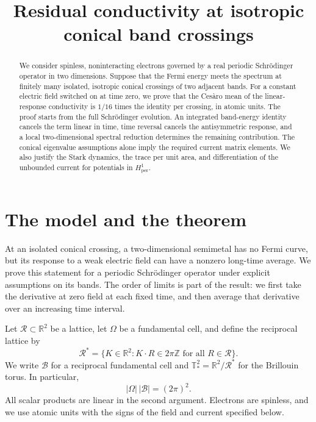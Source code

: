 \documentclass[11pt,a4paper]{article}
\title{Residual conductivity at isotropic conical band crossings}
\author{}
\date{}
\newcommand{\R}{\mathbb R}
\newcommand{\Z}{\mathbb Z}
\newcommand{\B}{\mathcal B}
\newcommand{\lat}{\mathcal R}
\newcommand{\T}{\mathbb T_{\!*}^{2}}
\numberwithin{equation}{section}
\begin{document}
\maketitle
\vspace{-1.5em}
\begin{abstract}
We consider spinless, noninteracting electrons governed by a real periodic
Schr\"odinger operator in two dimensions. Suppose that the Fermi energy
meets the spectrum at finitely many isolated, isotropic conical crossings
of two adjacent bands. For a constant electric field switched on at time
zero, we prove that the Ces\`aro mean of the linear-response conductivity
is $1/16$ times the identity per crossing, in atomic units. The proof
starts from the full Schr\"odinger evolution. An integrated band-energy
identity cancels the term linear in time, time reversal cancels the
antisymmetric response, and a local two-dimensional spectral reduction
determines the remaining contribution. The conical eigenvalue assumptions
alone imply the required current matrix elements. We also justify the
Stark dynamics, the trace per unit area, and differentiation of the
unbounded current for potentials in $H^1_{\mathrm{per}}$.
\end{abstract}

\section{The model and the theorem}

At an isolated conical crossing, a two-dimensional semimetal has no Fermi
curve, but its response to a weak electric field can have a nonzero
long-time average. We prove this statement for a periodic Schr\"odinger
operator under explicit assumptions on its bands. The order of limits is
part of the result: we first take the derivative at zero field at each
fixed time, and then average that derivative over an increasing time
interval.

Let $\lat\subset\R^2$ be a lattice, let $\Omega$ be a fundamental cell,
and define the reciprocal lattice by
\[
 \lat^*=\{K\in\R^2:K\cdot R\in2\pi\Z\text{ for all }R\in\lat\}.
\]
We write $\B$ for a reciprocal fundamental cell and
$\T=\R^2/\lat^*$ for the Brillouin torus. In particular,
\begin{equation}\label{eq:volumes}
 |\Omega|\,|\B|=(2\pi)^2.
\end{equation}
All scalar products are linear in the second argument. Electrons are
spinless, and we use atomic units with the signs of the field and current
specified below.
\end{document}
